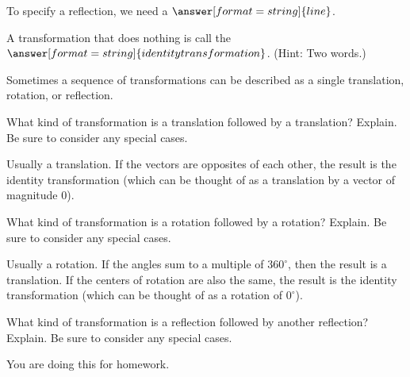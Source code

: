 \documentclass[nooutcomes]{ximera}
\begin{document}
\begin{question}
To specify a reflection, we need a $\answer[format=string]{line}$.  
\end{question}

\begin{question}
A transformation that does nothing is call the $\answer[format=string]{identity transformation}$.  (Hint: Two words.)
\end{question}

Sometimes a sequence of transformations can be described as a single translation, rotation, or reflection.  

\begin{question}
What kind of transformation is a translation followed by a translation?  Explain.  Be sure to consider any special cases.  
\begin{freeResponse}
\begin{hint}
Usually a translation.  If the vectors are opposites of each other, the result is the identity transformation (which can be thought of as a translation by a vector of magnitude $0$).
\end{hint}
\end{freeResponse}
\end{question}

\begin{question}
What kind of transformation is a rotation followed by a rotation?  Explain.  Be sure to consider any special cases.   
\begin{freeResponse}
\begin{hint}
Usually a rotation.  If the angles sum to a multiple of $360^\circ$, then the result is a translation.  If the centers of rotation are also the same, the result is the identity transformation (which can be thought of as a rotation of $0^\circ$).
\end{hint}
\end{freeResponse}
\end{question}

\begin{question}
What kind of transformation is a reflection followed by another reflection?  Explain.  Be sure to consider any special cases.  
\begin{freeResponse}
\begin{hint}
You are doing this for homework.  
\end{hint}
\end{freeResponse}
\end{question}
\end{document}
